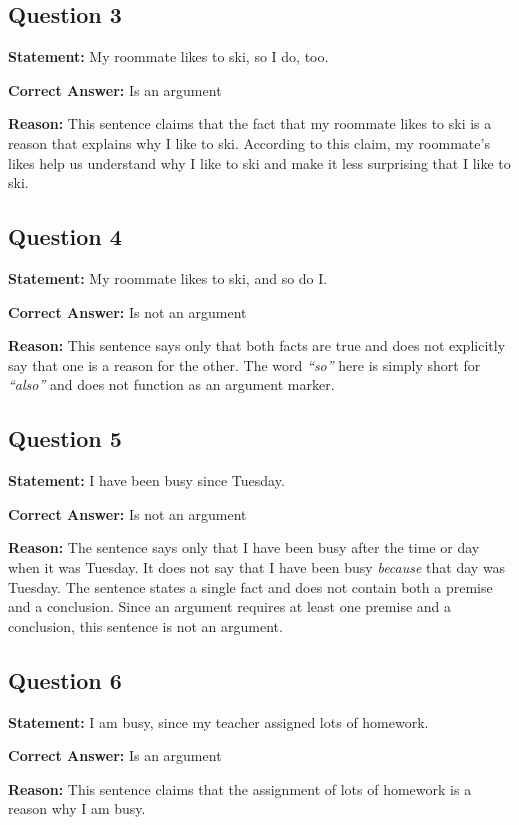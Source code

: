 \documentclass[12pt]{article}
\begin{document}
\subsection*{Question 3}
\textbf{Statement:}
My roommate likes to ski, so I do, too.

\textbf{Correct Answer:} Is an argument

\textbf{Reason:}
This sentence claims that the fact that my roommate likes to ski is a reason that explains why I like to ski. According to this claim, my roommate’s likes help us understand why I like to ski and make it less surprising that I like to ski.

\subsection*{Question 4}
\textbf{Statement:}
My roommate likes to ski, and so do I.

\textbf{Correct Answer:} Is not an argument

\textbf{Reason:}
This sentence says only that both facts are true and does not explicitly say that one is a reason for the other. The word \emph{``so''} here is simply short for \emph{``also''} and does not function as an argument marker.

\subsection*{Question 5}
\textbf{Statement:}
I have been busy since Tuesday.

\textbf{Correct Answer:} Is not an argument

\textbf{Reason:}
The sentence says only that I have been busy after the time or day when it was Tuesday. It does not say that I have been busy \emph{because} that day was Tuesday. The sentence states a single fact and does not contain both a premise and a conclusion. Since an argument requires at least one premise and a conclusion, this sentence is not an argument.

\subsection*{Question 6}
\textbf{Statement:}
I am busy, since my teacher assigned lots of homework.

\textbf{Correct Answer:} Is an argument

\textbf{Reason:}
This sentence claims that the assignment of lots of homework is a reason why I am busy.
\end{document}

